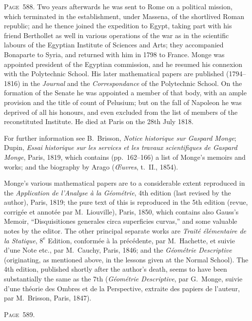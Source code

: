\documentclass[11pt,a4paper]{article}
\theoremstyle{definition}
\begin{document}
\newpage
\noindent\textsc{Page~588.} Two years afterwards he was sent to Rome on a political mission, which terminated in the establishment, under Massena, of the shortlived Roman republic; and he thence joined the expedition to Egypt, taking part with his friend Berthollet as well in various operations of the war as in the scientific labours of the Egyptian Institute of Sciences and Arts; they accompanied Bonaparte to Syria, and returned with him in 1798 to France. Monge was appointed president of the Egyptian commission, and he resumed his connexion with the Polytechnic School. His later mathematical papers are published (1794--1816) in the \textit{Journal} and the \textit{Correspondance} of the Polytechnic School. On the formation of the Senate he was appointed a member of that body, with an ample provision and the title of count of Pelusium; but on the fall of Napoleon he was deprived of all his honours, and even excluded from the list of members of the reconstituted Institute. He died at Paris on the 28th July 1818.

For further information see B.\ Brisson, \textit{Notice historique sur Gaspard Monge}; Dupin, \textit{Essai historique sur les services et les travaux scientifiques de Gaspard Monge}, Paris, 1819, which contains (pp.~162--166) a list of Monge's memoirs and works; and the biography by Arago (\textit{\OE uvres}, t.~II., 1854).

Monge's various mathematical papers are to a considerable extent reproduced in the \textit{Application de l'Analyse \`a la G\'eom\'etrie}, 4th edition (last revised by the author), Paris, 1819; the pure text of this is reproduced in the 5th edition (revue, corrig\'ee et annot\'ee par M.\ Liouville), Paris, 1850, which contains also Gauss's Memoir, ``Disquisitiones generales circa superficies curvas,'' and some valuable notes by the editor. The other principal separate works are \textit{Trait\'e \'el\'ementaire de la Statique}, $8^{\text{e}}$ Edition, conform\'ee \`a la pr\'ec\'edente, par M.\ Hachette, et suivie d'une Note etc., par M.\ Cauchy, Paris, 1846; and the \textit{G\'eom\'etrie Descriptive} (originating, as mentioned above, in the lessons given at the Normal School). The 4th edition, published shortly after the author's death, seems to have been substantially the same as the 7th (\textit{G\'eom\'etrie Descriptive}, par G.\ Monge, suivie d'une th\'eorie des Ombres et de la Perspective, extraite des papiers de l'auteur, par M.\ Brisson, Paris, 1847).

\newpage
\noindent\textsc{Page~589.}
\end{document}
